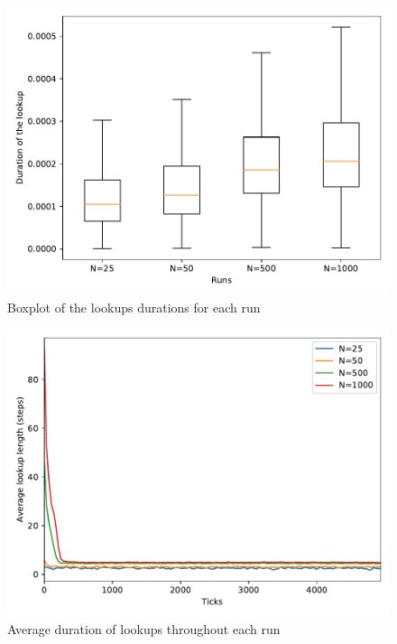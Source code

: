 \documentclass[11pt,twocolumn,letterpaper]{article}
\begin{document}
	\begin{figure}[!ht]
		\centering
		\includegraphics[width=\linewidth,clip,trim=0 0.5cm 0 0.35cm]{figures/analysis2/lookupduration_box.pdf}
		\caption{Boxplot of the lookups durations for each run}
		\label{fig:netsize0}
	\end{figure}	
	\begin{figure}[!ht]
		\centering
		\includegraphics[width=\linewidth,clip,trim=0 0.5cm 0 0.35cm]{figures/analysis2/lookuplength_time.pdf}
		\caption{Average duration of lookups throughout each run}
		\label{fig:netsize1}
	\end{figure}
\end{document}
